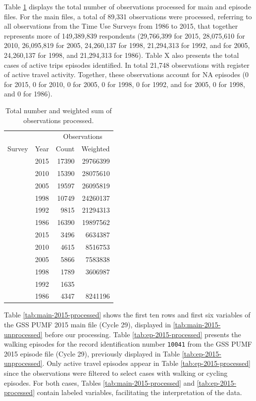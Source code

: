 \documentclass[Royal,times,sageh]{sagej}
\begin{document}
Table \ref{tab:processed-obs} displays the total number of observations
processed for main and episode files. For the main files, a total of
89,331 observations were processed, referring to all observations from
the Time Use Surveys from 1986 to 2015, that together represents more of
149,389,839 respondents (29,766,399 for 2015, 28,075,610 for 2010,
26,095,819 for 2005, 24,260,137 for 1998, 21,294,313 for 1992, and for
2005, 24,260,137 for 1998, and 21,294,313 for 1986). Table X also
presents the total cases of active trips episodes identified. In total
21,748 observations with register of active travel activity. Together,
these observations account for NA episodes (0 for 2015, 0 for 2010, 0
for 2005, 0 for 1998, 0 for 1992, and for 2005, 0 for 1998, and 0 for
1986).

\begingroup\fontsize{10}{12}\selectfont

\begin{longtable}[t]{lrrr}
\caption{\label{tab:table_df_processed}\label{tab:processed-obs}Total number and weighted sum of observations processed.}\\
\toprule
\multicolumn{2}{c}{ } & \multicolumn{2}{c}{Observations} \\
\cmidrule(l{3pt}r{3pt}){3-4}
Survey & Year & Count & Weighted\\
\midrule
 & 2015 & 17390 & 29766399\\
\nopagebreak
 & 2010 & 15390 & 28075610\\
\nopagebreak
 & 2005 & 19597 & 26095819\\
\nopagebreak
 & 1998 & 10749 & 24260137\\
\nopagebreak
 & 1992 & 9815 & 21294313\\
\nopagebreak
\multirow[t]{-6}{*}{\raggedright\arraybackslash Main} & 1986 & 16390 & 19897562\\
\cmidrule{1-4}\pagebreak[0]
 & 2015 & 3496 & 6634387\\
\nopagebreak
 & 2010 & 4615 & 8516753\\
\nopagebreak
 & 2005 & 5866 & 7583838\\
\nopagebreak
 & 1998 & 1789 & 3606987\\
\nopagebreak
 & 1992 & 1635 & \\
\nopagebreak
\multirow[t]{-6}{*}{\raggedright\arraybackslash Episode} & 1986 & 4347 & 8241196\\
\bottomrule
\end{longtable}
\endgroup{}

Table \ref{tab:main-2015-processed} shows the first ten rows and first
six variables of the GSS PUMF 2015 main file (Cycle 29), displayed in
\ref{tab:main-2015-unprocessed} before our processing. Table
\ref{tab:ep-2015-processed} presents the walking episodes for the record
identification number \texttt{10041} from the GSS PUMF 2015 episode file
(Cycle 29), previously displayed in Table \ref{tab:ep-2015-unprocessed}.
Only active travel episodes appear in Table \ref{tab:ep-2015-processed}
since the observations were filtered to select cases with walking or
cycling episodes. For both cases, Tables \ref{tab:main-2015-processed}
and \ref{tab:ep-2015-processed} contain labeled variables, facilitating
the interpretation of the data.
\end{document}

